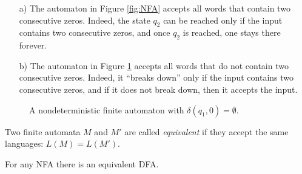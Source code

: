 \begin{page}
\setcounter{section}{1}
\setcounter{subsection}{3}
\setcounter{dfn}{7}
\label{portion:916}

\begin{exl}
\label{exl:NFA}
\par\noindent
\begin{enumerate}
\item[a)]
The automaton in Figure \ref{fig:NFA} accepts all words that contain two consecutive zeros.
Indeed, the state $q_2$ can be reached only if the input contains two consecutive zeros,
and once $q_2$ is reached, one stays there forever.
\item[b)]
The automaton in Figure \ref{fig:NFABroken} accepts all words that do not contain two consecutive zeros.
Indeed, it ``breaks down'' only if the input contains two consecutive zeros, and if it does not break down, then it accepts the input.
\end{enumerate}
\end{exl}

\end{page}

\begin{page}
\setcounter{section}{1}
\setcounter{subsection}{3}
\setcounter{dfn}{7}
\label{portion:917}


\begin{figure}[htb]
\begin{center}

\end{center}
\caption{A nondeterministic finite automaton with $\delta(q_1, 0) = \emptyset$.}
\label{fig:NFABroken}
\end{figure}



\end{page}

\begin{page}
\setcounter{section}{1}
\setcounter{subsection}{3}
\setcounter{dfn}{8}
\label{portion:919}

\begin{dfn}
Two finite automata $M$ and $M'$ are called \emph{equivalent} if they accept the same languages: $L(M) = L(M')$.
\end{dfn}

\end{page}

\begin{page}
\setcounter{section}{1}
\setcounter{subsection}{3}
\setcounter{dfn}{9}
\label{portion:922}

\begin{thm}
For any NFA there is an equivalent DFA.
\end{thm}

\end{page}

